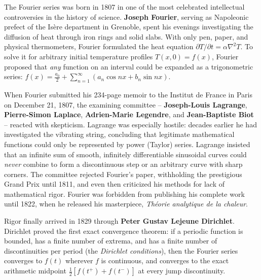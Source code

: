 \begin{historybox}
The Fourier series was born in 1807 in one of the most celebrated intellectual controversies in
the history of science. \textbf{Joseph Fourier}, serving as Napoleonic prefect of the Is\`{e}re
department in Grenoble, spent his evenings investigating the diffusion of heat through iron rings
and solid slabs. With only pen, paper, and physical thermometers, Fourier formulated the heat
equation $\partial T/\partial t = \alpha \nabla^2 T$. To solve it for arbitrary initial temperature
profiles $T(x,0) = f(x)$, Fourier proposed that \emph{any} function on an
interval could be expanded as a trigonometric series:
$f(x) = \frac{a_0}{2} + \sum_{n=1}^\infty (a_n\cos nx + b_n\sin nx)$.

When Fourier submitted his 234-page memoir to the Institut de France in Paris on December 21, 1807,
the examining committee -- \textbf{Joseph-Louis Lagrange}, \textbf{Pierre-Simon Laplace},
\textbf{Adrien-Marie Legendre}, and \textbf{Jean-Baptiste Biot} -- reacted with skepticism. Lagrange was especially hostile: decades
earlier he had investigated the vibrating string, concluding that legitimate mathematical functions
could only be represented by power (Taylor) series. Lagrange insisted that an infinite sum of
smooth, infinitely differentiable sinusoidal curves could \emph{never} combine to form a discontinuous
step or an arbitrary curve with sharp corners. The committee rejected Fourier's paper, withholding
the prestigious Grand Prix until 1811, and even then criticized his methods for lack of mathematical
rigor. Fourier was forbidden from publishing his complete work until 1822, when he released his
masterpiece, \emph{Th\'{e}orie analytique de la chaleur}.

Rigor finally arrived in 1829 through \textbf{Peter Gustav Lejeune Dirichlet}. Dirichlet proved the
first exact convergence theorem: if a periodic function is bounded, has a finite number of extrema,
and has a finite number of discontinuities per period (the \emph{Dirichlet conditions}), then the
Fourier series converges to $f(t)$ wherever $f$ is continuous, and converges to the exact arithmetic
midpoint $\frac{1}{2}[f(t^+) + f(t^-)]$ at every jump discontinuity.


\end{historybox}
